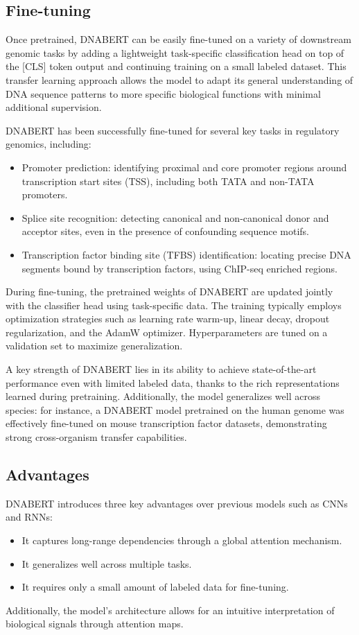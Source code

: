 \subsection{Fine-tuning}

Once pretrained, DNABERT can be easily fine-tuned on a variety of downstream genomic tasks by adding a lightweight task-specific classification head on top of the [CLS] token output and continuing training on a small labeled dataset. This transfer learning approach allows the model to adapt its general understanding of DNA sequence patterns to more specific biological functions with minimal additional supervision.

DNABERT has been successfully fine-tuned for several key tasks in regulatory genomics, including:
\begin{itemize}
    \item Promoter prediction: identifying proximal and core promoter regions around transcription start sites (TSS), including both TATA and non-TATA promoters.

    \item Splice site recognition: detecting canonical and non-canonical donor and acceptor sites, even in the presence of confounding sequence motifs.

    \item Transcription factor binding site (TFBS) identification: locating precise DNA segments bound by transcription factors, using ChIP-seq enriched regions.
\end{itemize}

During fine-tuning, the pretrained weights of DNABERT are updated jointly with the classifier head using task-specific data. The training typically employs optimization strategies such as learning rate warm-up, linear decay, dropout regularization, and the AdamW optimizer. Hyperparameters are tuned on a validation set to maximize generalization.

A key strength of DNABERT lies in its ability to achieve state-of-the-art performance even with limited labeled data, thanks to the rich representations learned during pretraining. Additionally, the model generalizes well across species: for instance, a DNABERT model pretrained on the human genome was effectively fine-tuned on mouse transcription factor datasets, demonstrating strong cross-organism transfer capabilities.

\subsection{Advantages}

DNABERT introduces three key advantages over previous models such as CNNs and RNNs:
\begin{itemize}
    \item It captures long-range dependencies through a global attention mechanism.
    \item It generalizes well across multiple tasks.
    \item It requires only a small amount of labeled data for fine-tuning.
\end{itemize}

Additionally, the model’s architecture allows for an intuitive interpretation of biological signals through attention maps.